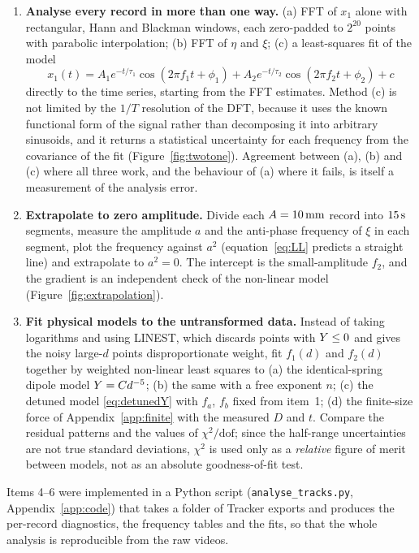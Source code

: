 \begin{enumerate}
\item \textbf{Analyse every record in more than one way.} (a) FFT of $x_1$ alone with rectangular, Hann and Blackman windows, each zero-padded to $2^{20}$ points with parabolic interpolation; (b) FFT of $\eta$ and $\xi$; (c) a least-squares fit of the model
\begin{equation}
x_1(t)=A_1e^{-t/\tau_1}\cos(2\pi f_1t+\phi_1)+A_2e^{-t/\tau_2}\cos(2\pi f_2t+\phi_2)+c
\label{eq:twotone}
\end{equation}
directly to the time series, starting from the FFT estimates. Method (c) is not limited by the $1/T$ resolution of the DFT, because it uses the known functional form of the signal rather than decomposing it into arbitrary sinusoids, and it returns a statistical uncertainty for each frequency from the covariance of the fit (Figure~\ref{fig:twotone}). Agreement between (a), (b) and (c) where all three work, and the behaviour of (a) where it fails, is itself a measurement of the analysis error.

\item \textbf{Extrapolate to zero amplitude.} Divide each $A=10\,\mathrm{mm}$ record into $15\,\mathrm{s}$ segments, measure the amplitude $a$ and the anti-phase frequency of $\xi$ in each segment, plot the frequency against $a^2$ (equation~\eqref{eq:LL} predicts a straight line) and extrapolate to $a^2=0$. The intercept is the small-amplitude $f_2$, and the gradient is an independent check of the non-linear model (Figure~\ref{fig:extrapolation}).

\item \textbf{Fit physical models to the untransformed data.} Instead of taking logarithms and using LINEST, which discards points with $Y\leq0$ and gives the noisy large-$d$ points disproportionate weight, fit $f_1(d)$ and $f_2(d)$ together by weighted non-linear least squares to (a) the identical-spring dipole model $Y=Cd^{-5}$; (b) the same with a free exponent $n$; (c) the detuned model \eqref{eq:detunedY} with $f_a$, $f_b$ fixed from item~1; (d) the finite-size force of Appendix~\ref{app:finite} with the measured $D$ and $t$. Compare the residual patterns and the values of $\chi^2/\text{dof}$; since the half-range uncertainties are not true standard deviations, $\chi^2$ is used only as a \emph{relative} figure of merit between models, not as an absolute goodness-of-fit test.
\end{enumerate}

Items 4--6 were implemented in a Python script (\texttt{analyse\_tracks.py}, Appendix~\ref{app:code}) that takes a folder of Tracker exports and produces the per-record diagnostics, the frequency tables and the fits, so that the whole analysis is reproducible from the raw videos.
